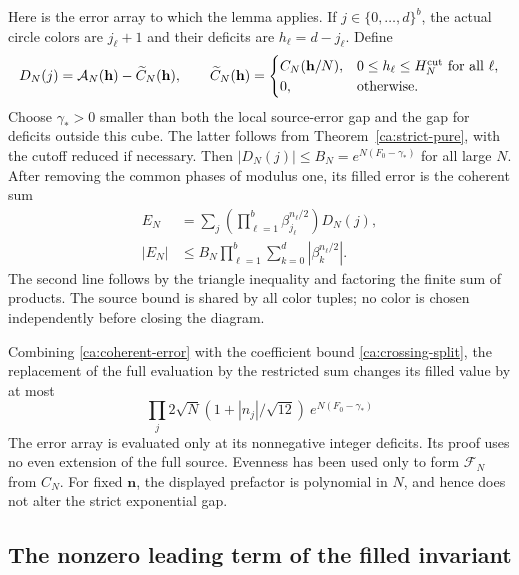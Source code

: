 Here is the error array to which the lemma applies. If
$j\in\{0,\ldots,d\}^b$, the actual circle colors are $j_\ell+1$
and their deficits are $h_\ell=d-j_\ell$. Define
\[
 D_N(j)=\mathcal A_N(\mathbf h)-\widetilde C_N(\mathbf h),\qquad
 \widetilde C_N(\mathbf h)=
 \begin{cases}
 C_N(\mathbf h/N),&0\le h_\ell\le H_N^{\rm cut}\text{ for all }\ell,\\
 0,&\text{otherwise}.
 \end{cases}
\]
Choose $\gamma_*>0$ smaller than both the local source-error gap
and the gap for deficits outside this cube. The latter follows from
Theorem~\ref{ca:strict-pure}, with the cutoff reduced if necessary.
Then $|D_N(j)|\le B_N=e^{N(F_0-\gamma_*)}$ for all large $N$. After removing the common
phases of modulus one, its filled error is the coherent sum
\begin{equation}\label{ca:coherent-error}
\begin{aligned}
 E_N&=\sum_j\left(\prod_{\ell=1}^b
                   \beta_{j_\ell}^{n_\ell/2}\right)D_N(j),\\
 |E_N|&\le B_N\prod_{\ell=1}^b
                   \sum_{k=0}^d|\beta_k^{n_\ell/2}|.
\end{aligned}
\end{equation}
The second line follows by the triangle inequality and factoring the
finite sum of products. The source bound is shared by all color tuples;
no color is chosen independently before closing the diagram.

Combining \eqref{ca:coherent-error} with the coefficient bound
\eqref{ca:crossing-split}, the replacement of the full evaluation
by the restricted sum changes its filled value by at most
\begin{equation}\label{ca:filled-error}
 \prod_j2\sqrt N(1+|n_j|/\sqrt{12})\ e^{N(F_0-\gamma_*)}
\end{equation}
The error array is evaluated only at its nonnegative integer deficits.
Its proof uses no even extension of the full source. Evenness has been
used only to form $\mathcal F_N$ from $C_N$. For fixed $\mathbf n$,
the displayed prefactor is polynomial in $N$, and hence does not alter
the strict exponential gap.

\subsection{The nonzero leading term of the filled invariant}

